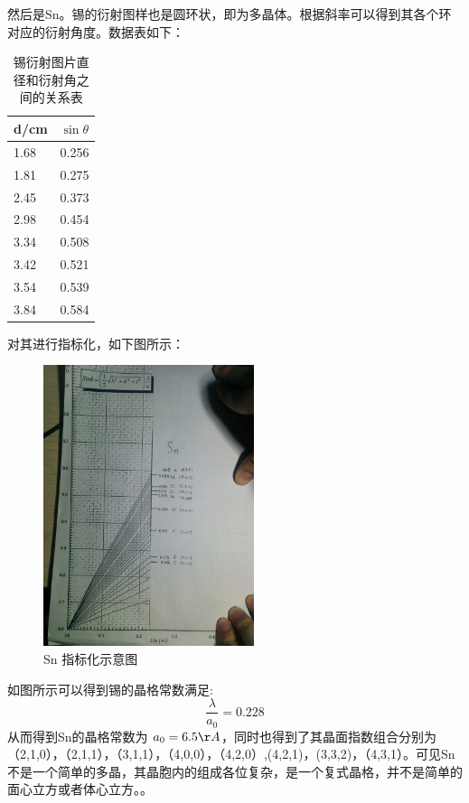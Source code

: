 \documentclass[aps,pre,12pt,preprint,onecolumn,showpacs,showkeys,UTF8]{revtex4-1}
\begin{document}
然后是Sn。锡的衍射图样也是圆环状，即为多晶体。根据斜率可以得到其各个环对应的衍射角度。数据表如下：

\begin{center}
	\begin{table}[h]
		\caption{锡衍射图片直径和衍射角之间的关系表}
		\begin{tabularx}{10cm}{XX}
			\hline
			\hline
			d/cm&$\sin{\theta}$\\
			\hline
			1.68&0.256\\
			1.81&0.275\\
			2.45&0.373\\
			2.98&0.454\\
			3.34&0.508\\
			3.42&0.521\\
			3.54&0.539\\
			3.84&0.584\\
			\hline
			\hline
		\end{tabularx}
	\end{table}
\end{center}
对其进行指标化，如下图所示：
\newpage
\begin{figure}[h]
	\begin{center}
		\includegraphics[width=0.55\textwidth]{Sn.png}
		\caption{\label{fig:exp2}Sn 指标化示意图}
	\end{center}
\end{figure}

如图所示可以得到锡的晶格常数满足:
\begin{equation}
	\frac{\lambda}{a_0}=0.228
\end{equation}
从而得到Sn的晶格常数为 $a_0=6.5\AA$，同时也得到了其晶面指数组合分别为（2,1,0），（2,1,1），（3,1,1），（4,0,0），（4,2,0）,(4,2,1)，(3,3,2)，（4,3,1）。可见Sn不是一个简单的多晶，其晶胞内的组成各位复杂，是一个复式晶格，并不是简单的面心立方或者体心立方。\cite{guti}。
\end{document}
